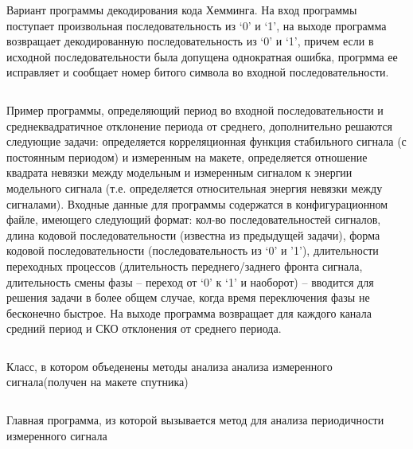 \solutionSection

Вариант программы декодирования кода Хемминга. На вход программы поступает произвольная последовательность из ‘0’ и ‘1’, на выходе программа возвращает декодированную последовательность из ‘0’ и ‘1’, причем если в исходной последовательности была допущена однократная ошибка, прогрмма ее исправляет и сообщает номер битого символа во входной последовательности.

\inputminted[fontsize=\footnotesize, linenos]{cpp}{final/command_tour/telecom/task_01/source_1.cpp}

Пример программы, определяющий период во входной последовательности и среднеквадратичное отклонение периода от среднего, дополнительно решаются следующие задачи: определяется корреляционная функция стабильного сигнала (с постоянным периодом) и измеренным на макете, определяется отношение квадрата невязки между модельным и измеренным сигналом к энергии модельного сигнала (т.е. определяется относительная энергия невязки между сигналами). Входные данные для программы содержатся в конфигурационном файле, имеющего следующий формат: кол-во последовательностей сигналов, длина кодовой последовательности (известна из предыдущей задачи), форма кодовой последовательности (последовательность из ‘0’ и ’1’), длительности переходных процессов (длительность переднего/заднего фронта сигнала, длительность смены фазы – переход от ‘0’ к ‘1’ и наоборот) – вводится для решения задачи в более общем случае, когда время переключения фазы не бесконечно быстрое. На выходе программа возвращает для каждого канала средний период и СКО отклонения от среднего периода.

\inputminted[fontsize=\footnotesize, linenos]{cpp}{final/command_tour/telecom/task_01/source_2.cpp}

Класс, в котором объеденены методы анализа анализа измеренного сигнала(получен на макете спутника)

\inputminted[fontsize=\footnotesize, linenos]{cpp}{final/command_tour/telecom/task_01/source_3.cpp}

Главная программа, из которой вызывается метод для анализа периодичности измеренного сигнала

\inputminted[fontsize=\footnotesize, linenos]{cpp}{final/command_tour/telecom/task_01/source_4.cpp}
